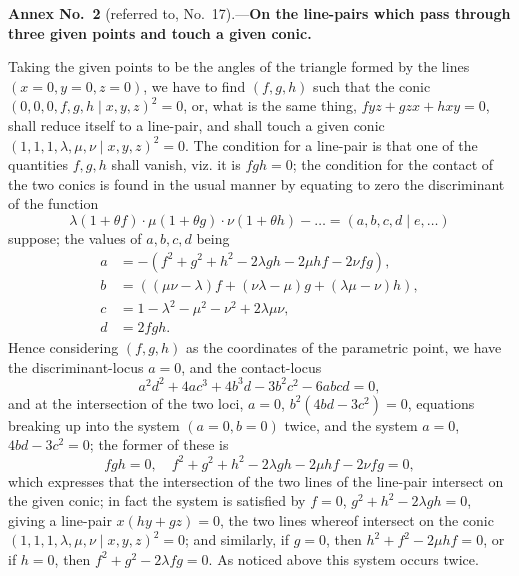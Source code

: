 \documentclass[12pt,a4paper]{article}
\begin{document}
\bigskip
\noindent\textbf{Annex No.~2} (referred to, No.~17).---\textbf{On the line-pairs which pass through three given points and touch a given conic.}

\smallskip

Taking the given points to be the angles of the triangle formed by the lines $(x = 0, y = 0, z = 0)$, we have to find $(f, g, h)$ such that the conic $(0, 0, 0, f, g, h \mid x, y, z)^2 = 0$, or, what is the same thing, $fyz + gzx + hxy = 0$, shall reduce itself to a line-pair, and shall touch a given conic $(1, 1, 1, \lambda, \mu, \nu \mid x, y, z)^2 = 0$. The condition for a line-pair is that one of the quantities $f, g, h$ shall vanish, viz. it is $fgh = 0$; the condition for the contact of the two conics is found in the usual manner by equating to zero the discriminant of the function
\[
\lambda(1 + \theta f)\cdot\mu(1 + \theta g)\cdot\nu(1 + \theta h) - \ldots = (a, b, c, d \mid e, \ldots)
\]
suppose; the values of $a, b, c, d$ being
\begin{align*}
a &= -(f^2 + g^2 + h^2 - 2\lambda gh - 2\mu hf - 2\nu fg),\\
b &= ((\mu\nu - \lambda)f + (\nu\lambda - \mu)g + (\lambda\mu - \nu)h),\\
c &= 1 - \lambda^2 - \mu^2 - \nu^2 + 2\lambda\mu\nu,\\
d &= 2fgh.
\end{align*}
Hence considering $(f, g, h)$ as the coordinates of the parametric point, we have the discriminant-locus $a = 0$, and the contact-locus
\[
a^2d^2 + 4ac^3 + 4b^3d - 3b^2c^2 - 6abcd = 0,
\]
and at the intersection of the two loci, $a = 0$, $b^2(4bd - 3c^2) = 0$, equations breaking up into the system $(a = 0, b = 0)$ twice, and the system $a = 0$, $4bd - 3c^2 = 0$; the former of these is
\[
fgh = 0,\quad f^2 + g^2 + h^2 - 2\lambda gh - 2\mu hf - 2\nu fg = 0,
\]
which expresses that the intersection of the two lines of the line-pair intersect on the given conic; in fact the system is satisfied by $f = 0$, $g^2 + h^2 - 2\lambda gh = 0$, giving a line-pair $x(hy + gz) = 0$, the two lines whereof intersect on the conic $(1, 1, 1, \lambda, \mu, \nu \mid x, y, z)^2 = 0$; and similarly, if $g = 0$, then $h^2 + f^2 - 2\mu hf = 0$, or if $h = 0$, then $f^2 + g^2 - 2\lambda fg = 0$. As noticed above this system occurs twice.
\end{document}
